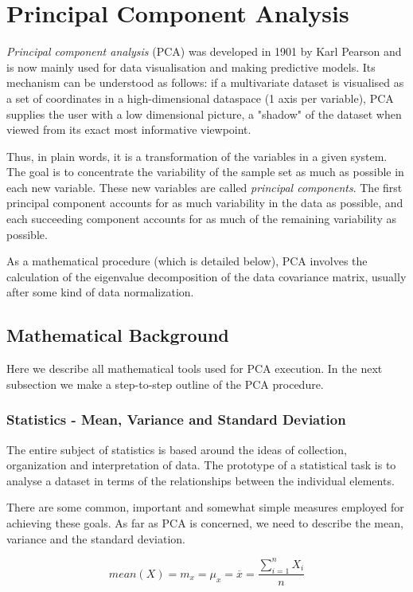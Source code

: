 \documentclass[12pt]{article}
\begin{document}
\section{Principal Component Analysis}
\emph{Principal component analysis} (PCA) was developed in 1901 by Karl Pearson
and is now mainly used for data visualisation and making predictive models.
Its mechanism can be understood as follows: if a multivariate dataset is 
visualised as a set of coordinates in a high-dimensional
dataspace (1 axis per variable), PCA supplies the user with a low dimensional picture,
a "shadow" of the dataset when viewed from its exact most informative viewpoint.

Thus, in plain words, it is a transformation of
the variables in a given system. The goal is to concentrate the variability
of the sample set as much as possible in each new variable. These new
variables are called \emph{principal components}. The first principal component
accounts for as much variability in the data as possible, and each succeeding
component accounts for as much of the remaining variability as possible.

As a mathematical procedure (which is detailed below), PCA involves the calculation
of the eigenvalue decomposition of the data covariance matrix, usually after
some kind of data normalization.

\subsection{Mathematical Background}
Here we describe all mathematical tools used for PCA execution. In the next
subsection we make a step-to-step outline of the PCA procedure.

\subsubsection{Statistics - Mean, Variance and Standard Deviation}
The entire subject of statistics is based around the ideas of collection, organization and
interpretation of data. The prototype of a statistical task is to analyse a dataset
in terms of the relationships between the individual elements.

There are some common, important and somewhat simple measures employed for achieving
these goals. As far as PCA is concerned, we need to describe the mean, variance and the
standard deviation.

\begin{equation}
mean(X) = m_x=\mu_x=\overline{x}=\frac{\sum_{i=1}^{n}X_i}{n}
\end{equation}
\end{document}
